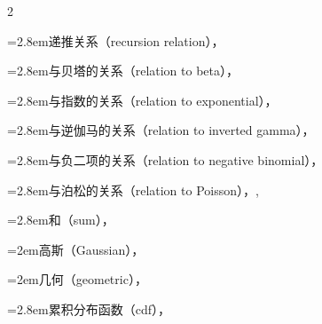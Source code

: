 \begin{multicols}{2}
\par\noindent\hangindent=2.8em\hspace*{1.8em}\label{idx:310}递推关系（recursion relation），\hyperref[thm:3.6.4]{\pageref*{thm:3.6.4}}\par
\par\noindent\hangindent=2.8em\hspace*{1.8em}\label{idx:311}与贝塔的关系（relation to beta），\hyperref[exercise:4.24]{\pageref*{exercise:4.24}}\par
\par\noindent\hangindent=2.8em\hspace*{1.8em}\label{idx:312}与指数的关系（relation to exponential），\hyperref[exercise:4.38]{\pageref*{exercise:4.38}}\par
\par\noindent\hangindent=2.8em\hspace*{1.8em}\label{idx:313}与逆伽马的关系（relation to inverted gamma），\hyperref[ex:2.1.6]{\pageref*{ex:2.1.6}}\par
\par\noindent\hangindent=2.8em\hspace*{1.8em}\label{idx:314}与负二项的关系（relation to negative binomial），\hyperref[exercise:3.18]{\pageref*{exercise:3.18}}\par
\par\noindent\hangindent=2.8em\hspace*{1.8em}\label{idx:315}与泊松的关系（relation to Poisson），\hyperref[ex:3.3.1]{\pageref*{ex:3.3.1}}, \hyperref[exercise:3.19]{\pageref*{exercise:3.19}}\par
\par\noindent\hangindent=2.8em\hspace*{1.8em}\label{idx:316}和（sum），\hyperref[ex:4.6.8]{\pageref*{ex:4.6.8}}\par
\par\noindent\hangindent=2em\hspace*{1em}\label{idx:317}高斯（Gaussian），\hyperref[idxocc:317:114]{\pageref*{idxocc:317:114}}\par
\par\noindent\hangindent=2em\hspace*{1em}\label{idx:318}几何（geometric），\hyperref[idxocc:318:111]{\pageref*{idxocc:318:111}}\par
\par\noindent\hangindent=2.8em\hspace*{1.8em}\label{idx:319}累积分布函数（cdf），\hyperref[ex:1.5.4]{\pageref*{ex:1.5.4}}\par

\end{multicols}
